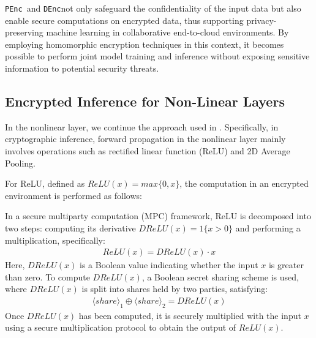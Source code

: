 \documentclass[conference]{IEEEtran}
\newcommand{\DEnc}{\texttt{DEnc}}
\newcommand{\PEnc}{\texttt{PEnc}}
\begin{document}
\PEnc~and \DEnc not only safeguard the confidentiality of the input data but also enable secure computations on encrypted data, thus supporting privacy-preserving machine learning in collaborative end-to-cloud environments. By employing homomorphic encryption techniques in this context, it becomes possible to perform joint model training and inference without exposing sensitive information to potential security threats.




\subsection{Encrypted Inference for Non-Linear Layers}

In the nonlinear layer, we continue the approach used in \cite{279898}. Specifically, in cryptographic inference, forward propagation in the nonlinear layer mainly involves operations such as rectified linear function (ReLU) and 2D Average Pooling.

 For ReLU, defined as $ReLU(x)=max\{0,x\}$, the computation in an encrypted environment is performed as follows:
 
 In a secure multiparty computation (MPC) framework, ReLU is decomposed into two steps: computing its derivative $DReLU(x)=1 \{x>0\}$ and performing a multiplication, specifically:
\begin{equation*}
\begin{array}{c}
       ReLU(x)=DReLU(x) \cdot x
\end{array}
\end{equation*}
Here, $DReLU(x)$ is a Boolean value indicating whether the input $x$ is greater than zero. To compute $DReLU(x)$, a Boolean secret sharing scheme is used, where $DReLU(x)$ is split into shares held by two parties, satisfying: 
\begin{equation*}
\begin{array}{c}
       \langle share\rangle_1\oplus\langle share\rangle_2=DReLU(x)
\end{array}
\end{equation*}
Once $DReLU(x)$ has been computed, it is securely multiplied with the input $x$ using a secure multiplication protocol to obtain the output of $ReLU(x)$.
\end{document}
